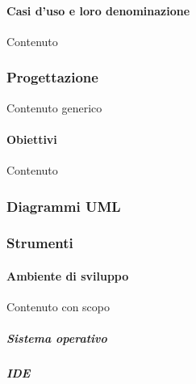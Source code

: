 		        \paragraph{Casi d'uso e loro denominazione}\label{PP:Sviluppo:AdR:CasiUso}
		        Contenuto
		        


        \subsubsection{Progettazione}\label{PP:Sviluppo:Progettazione}
        Contenuto generico
        

		    \paragraph{Obiettivi}\label{PP:Sviluppo:Progettazione:Obiettivi}
		    Contenuto



		\subsubsection{Diagrammi UML}\label{PP:Sviluppo:UML}	
		

        
        \subsubsection{Strumenti}\label{PP:Sviluppo:Strumenti}
        
	        \paragraph{Ambiente di sviluppo}\label{PP:Sviluppo:Strumenti:AmbienteSviluppo}
	        Contenuto con scopo
	        	
	        \subparagraph{Sistema operativo}\label{PP:Sviluppo:Strumenti:AmbienteSviluppo:SistemaOperativo}
	        		
	        \subparagraph{IDE}\label{PP:Sviluppo:Strumenti:AmbienteSviluppo:IDE}
        
		
		
	